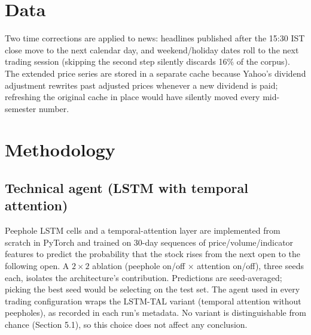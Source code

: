 \documentclass[11pt,a4paper]{article}
\begin{document}
\section{Data}
\begin{table}[H]
\centering
\small
\caption{Data used in the final evaluation.}\label{tab:data}
\end{table}

Two time corrections are applied to news: headlines published after the 15:30 IST close move to the next calendar day, and weekend/holiday dates roll to the next trading session (skipping the second step silently discards 16\% of the corpus). The extended price series are stored in a separate cache because Yahoo's dividend adjustment rewrites past adjusted prices whenever a new dividend is paid; refreshing the original cache in place would have silently moved every mid-semester number.
\section{Methodology}
\subsection{Technical agent (LSTM with temporal attention)}
Peephole LSTM cells and a temporal-attention layer are implemented from scratch in PyTorch and trained on 30-day sequences of price/volume/indicator features to predict the probability that the stock rises from the next open to the following open. A $2\times2$ ablation (peephole on/off $\times$ attention on/off), three seeds each, isolates the architecture's contribution. Predictions are seed-averaged; picking the best seed would be selecting on the test set. The agent used in every trading configuration wraps the LSTM-TAL variant (temporal attention without peepholes), as recorded in each run's metadata. No variant is distinguishable from chance (Section 5.1), so this choice does not affect any conclusion.
\end{document}
